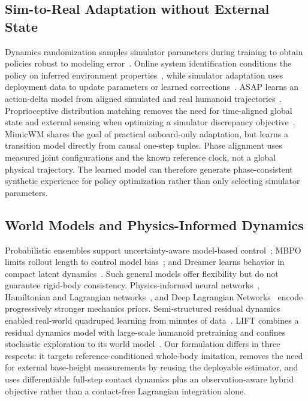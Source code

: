 \documentclass[10pt,twocolumn]{article}
\newcommand{\method}{MimicWM}
\begin{document}
\subsection{Sim-to-Real Adaptation without External State}

Dynamics randomization samples simulator parameters during training to obtain policies robust to modeling error~\cite{tobin2017domain,peng2018dynamics}. Online system identification conditions the policy on inferred environment properties~\cite{yu2017preparing,kumar2022adapting}, while simulator adaptation uses deployment data to update parameters or learned corrections~\cite{jiang2021simgan,heiden2021neuralsim}. ASAP learns an action-delta model from aligned simulated and real humanoid trajectories~\cite{he2025asap}. Proprioceptive distribution matching removes the need for time-aligned global state and external sensing when optimizing a simulator discrepancy objective~\cite{dao2026distribution}. \method{} shares the goal of practical onboard-only adaptation, but learns a transition model directly from causal one-step tuples. Phase alignment uses measured joint configurations and the known reference clock, not a global physical trajectory. The learned model can therefore generate phase-consistent synthetic experience for policy optimization rather than only selecting simulator parameters.

\subsection{World Models and Physics-Informed Dynamics}

Probabilistic ensembles support uncertainty-aware model-based control~\cite{chua2018pets}; MBPO limits rollout length to control model bias~\cite{janner2019mbpo}; and Dreamer learns behavior in compact latent dynamics~\cite{hafner2023dreamerv3}. Such general models offer flexibility but do not guarantee rigid-body consistency. Physics-informed neural networks~\cite{raissi2019pinn}, Hamiltonian and Lagrangian networks~\cite{greydanus2019hamiltonian,cranmer2020lagrangian}, and Deep Lagrangian Networks~\cite{lutter2019deep} encode progressively stronger mechanics priors. Semi-structured residual dynamics enabled real-world quadruped learning from minutes of data~\cite{levy2024three}. LIFT combines a residual dynamics model with large-scale humanoid pretraining and confines stochastic exploration to its world model~\cite{huang2026lift}. Our formulation differs in three respects: it targets reference-conditioned whole-body imitation, removes the need for external base-height measurements by reusing the deployable estimator, and uses differentiable full-step contact dynamics plus an observation-aware hybrid objective rather than a contact-free Lagrangian integration alone.
\end{document}

